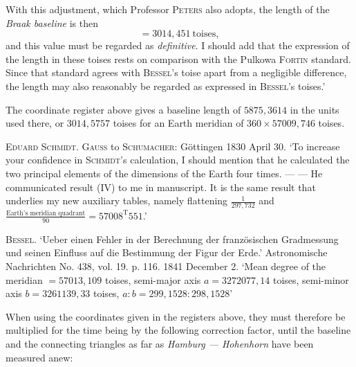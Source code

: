 With this adjustment, which Professor \textsc{Peters} also adopts, the length of the \textit{Braak baseline} is then
\[
=3014{,}451\ \text{toises},
\]
and this value must be regarded as \textit{definitive}. I should add that the expression of the length in these toises rests on comparison with the Pulkowa \textsc{Fortin} standard. Since that standard agrees with \textsc{Bessel}’s toise apart from a negligible difference, the length may also reasonably be regarded as expressed in \textsc{Bessel}’s toises.’

The coordinate register above gives a baseline length of \(5875{,}3614\) in the units used there, or \(3014{,}5757\) toises for an Earth meridian of \(360\times57009{,}746\) toises.

\textsc{Eduard Schmidt. Gauss} to \textsc{Schumacher}: Göttingen 1830 April 30. ‘To increase your confidence in \textsc{Schmidt}’s calculation, I should mention that he calculated the two principal elements of the dimensions of the Earth four times. — — He communicated result (IV) to me in manuscript. It is the same result that underlies my new auxiliary tables, namely flattening \(\frac{1}{297{,}732}\) and \(\frac{\text{Earth’s meridian quadrant}}{90}=57008^{\mathrm{T}}551\).’

\textsc{Bessel}. ‘Ueber einen Fehler in der Berechnung der französischen Gradmessung und seinen Einfluss auf die Bestimmung der Figur der Erde.’ Astronomische Nachrichten No. 438, vol. 19. p. 116. 1841 December 2. ‘Mean degree of the meridian \(=57013{,}109\) toises, semi-major axis \(a=3272077{,}14\) toises, semi-minor axis \(b=3261139{,}33\) toises, \(a:b=299{,}1528:298{,}1528\)’

When using the coordinates given in the registers above, they must therefore be multiplied for the time being by the following correction factor, until the baseline and the connecting triangles as far as \textit{Hamburg — Hohenhorn} have been measured anew:
